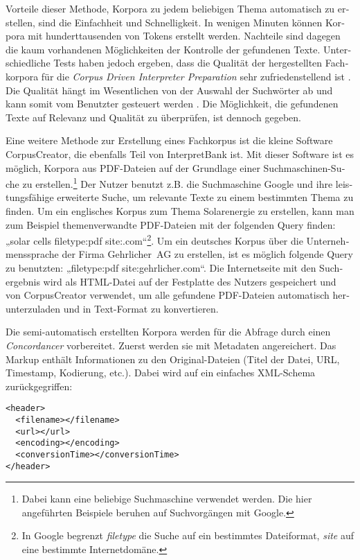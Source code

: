 \documentclass[output=paper]{LSP/langsci}
\begin{document}
\begin{otherlanguage}{ngerman}
Vorteile dieser Methode, Korpora zu jedem beliebigen Thema automatisch zu erstellen, sind die Einfachheit und Schnelligkeit. In wenigen Minuten können Korpora mit hunderttausenden von Tokens erstellt werden. Nachteile sind dagegen die kaum vorhandenen Möglichkeiten der Kontrolle der gefundenen Texte. Unterschiedliche Tests haben jedoch ergeben, dass die Qualität der hergestellten Fachkorpora für die \textit{Corpus Driven Interpreter Preparation} sehr zufriedenstellend ist \citep{Fantinuoli2006}. Die Qualität hängt im Wesentlichen von der Auswahl der Suchwörter ab und kann somit vom Benutzter gesteuert werden \citep{Ueyama2006}. Die Möglichkeit, die gefundenen Texte auf Relevanz und Qualität zu überprüfen, ist dennoch gegeben.

Eine weitere Methode zur Erstellung eines Fachkorpus ist die kleine Software CorpusCreator, die ebenfalls Teil von InterpretBank ist. Mit dieser Software ist es möglich, Korpora aus PDF-Dateien auf der Grundlage einer Suchmaschinen-Suche zu erstellen.\footnote{Dabei kann eine beliebige Suchmaschine verwendet werden. Die hier angeführten Beispiele beruhen auf Suchvorgängen mit Google.} Der Nutzer benutzt z.B. die Suchmaschine Google und ihre leistungsfähige erweiterte Suche, um relevante Texte zu einem bestimmten Thema zu finden. Um ein englisches Korpus zum Thema Solarenergie zu erstellen, kann man zum Beispiel themenverwandte PDF-Dateien mit der folgenden Query finden: „solar cells filetype:pdf site:.com“\footnote{In Google begrenzt \textit{filetype} die Suche auf ein bestimmtes Dateiformat, \textit{site} auf eine bestimmte Internetdomäne.}. Um ein deutsches Korpus über die Unternehmenssprache der Firma Gehrlicher~AG zu erstellen, ist es möglich folgende Query zu benutzten: „filetype:pdf site:gehrlicher.com“. Die Internetseite mit den Suchergebnis wird als HTML-Datei auf der Festplatte des Nutzers gespeichert und von CorpusCreator verwendet, um alle gefundene PDF-Dateien automatisch herunterzuladen und in Text-Format zu konvertieren.
 
Die semi-automatisch erstellten Korpora werden für die Abfrage durch einen \textit{Concordancer} vorbereitet. Zuerst werden sie mit Metadaten angereichert. Das Markup enthält Informationen zu den Original-Dateien (Titel der Datei, URL, Timestamp, Kodierung, etc.). Dabei wird auf ein einfaches XML-Schema zurückgegriffen:

\ea
\begin{lstlisting}
<header>
  <filename></filename>
  <url></url>
  <encoding></encoding>
  <conversionTime></conversionTime>
</header>
\end{lstlisting}
\z


\end{otherlanguage}
\end{document}

